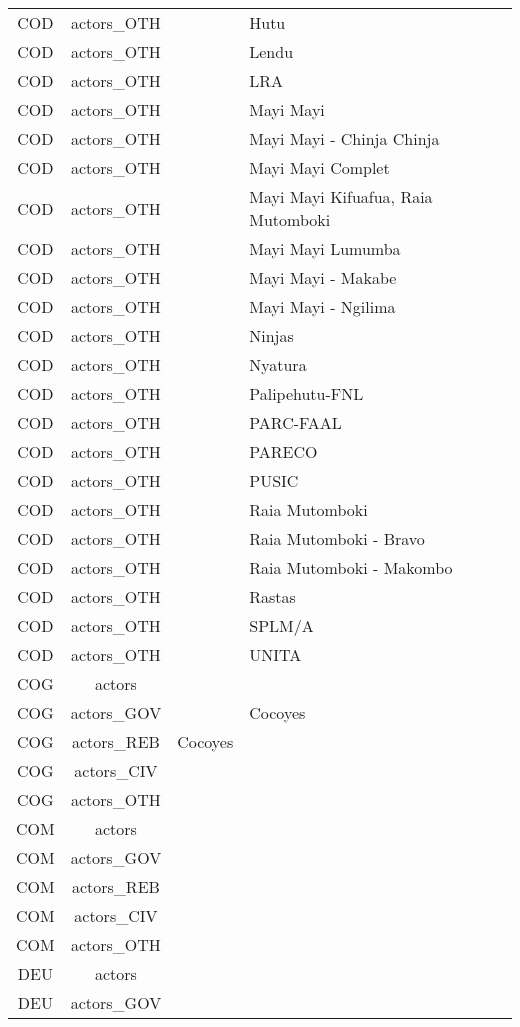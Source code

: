\documentclass[12pt]{article}
\begin{document}
\begin{center}
\begin{longtable}{|c|c|p{7cm}|p{7cm}|}
  COD & actors\_OTH &  & Hutu \\ 
  COD & actors\_OTH &  & Lendu \\ 
  COD & actors\_OTH &  & LRA \\ 
  COD & actors\_OTH &  & Mayi Mayi \\ 
  COD & actors\_OTH &  & Mayi Mayi - Chinja Chinja \\ 
  COD & actors\_OTH &  & Mayi Mayi Complet \\ 
  COD & actors\_OTH &  & Mayi Mayi Kifuafua, Raia Mutomboki \\ 
  COD & actors\_OTH &  & Mayi Mayi Lumumba \\ 
  COD & actors\_OTH &  & Mayi Mayi - Makabe \\ 
  COD & actors\_OTH &  & Mayi Mayi - Ngilima \\ 
  COD & actors\_OTH &  & Ninjas \\ 
  COD & actors\_OTH &  & Nyatura \\ 
  COD & actors\_OTH &  & Palipehutu-FNL \\ 
  COD & actors\_OTH &  & PARC-FAAL \\ 
  COD & actors\_OTH &  & PARECO \\ 
  COD & actors\_OTH &  & PUSIC \\ 
  COD & actors\_OTH &  & Raia Mutomboki \\ 
  COD & actors\_OTH &  & Raia Mutomboki - Bravo \\ 
  COD & actors\_OTH &  & Raia Mutomboki - Makombo \\ 
  COD & actors\_OTH &  & Rastas \\ 
  COD & actors\_OTH &  & SPLM/A \\ 
  COD & actors\_OTH &  & UNITA \\ 
  COG & actors &  &  \\ 
  COG & actors\_GOV &  & Cocoyes \\ 
  COG & actors\_REB & Cocoyes &  \\ 
  COG & actors\_CIV &  &  \\ 
  COG & actors\_OTH &  &  \\ 
  COM & actors &  &  \\ 
  COM & actors\_GOV &  &  \\ 
  COM & actors\_REB &  &  \\ 
  COM & actors\_CIV &  &  \\ 
  COM & actors\_OTH &  &  \\ 
  DEU & actors &  &  \\ 
  DEU & actors\_GOV &  &  \\ 

\end{longtable}
\end{center}
\end{document}
